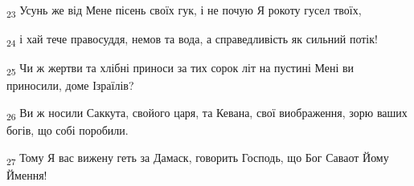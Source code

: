 \begin{tcolorbox}
\textsubscript{23} Усунь же від Мене пісень своїх гук, і не почую Я рокоту гусел твоїх,
\end{tcolorbox}
\begin{tcolorbox}
\textsubscript{24} і хай тече правосуддя, немов та вода, а справедливість як сильний потік!
\end{tcolorbox}
\begin{tcolorbox}
\textsubscript{25} Чи ж жертви та хлібні приноси за тих сорок літ на пустині Мені ви приносили, доме Ізраїлів?
\end{tcolorbox}
\begin{tcolorbox}
\textsubscript{26} Ви ж носили Саккута, свойого царя, та Кевана, свої виображення, зорю ваших богів, що собі поробили.
\end{tcolorbox}
\begin{tcolorbox}
\textsubscript{27} Тому Я вас вижену геть за Дамаск, говорить Господь, що Бог Саваот Йому Ймення!
\end{tcolorbox}
